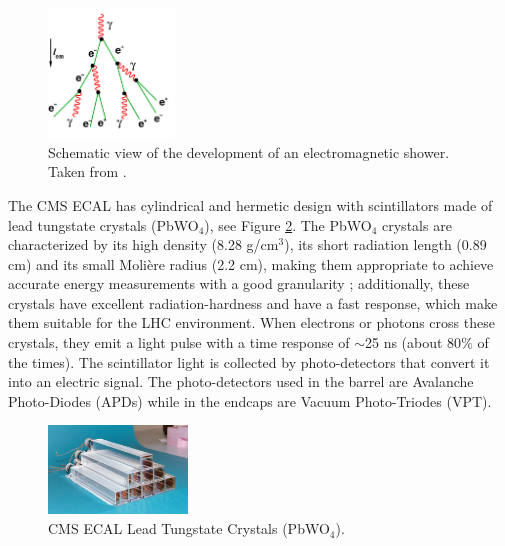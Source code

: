 
\begin{figure}[ht]
    \begin{center}
      \includegraphics[width=0.3\textwidth]{figuras/Chapter2/ElectroCascade.png}
      \caption{Schematic view of the development of an electromagnetic shower. Taken from \cite{EMFigure}.
      } \label{figchp2:EMshower}
    \end{center}
 \end{figure}

\noindent The CMS ECAL has cylindrical and hermetic design with scintillators made of 
lead tungstate crystals (PbWO$_{4}$), see Figure \ref{figchp2:ECALcrytal}. The PbWO$_{4}$ crystals are
characterized by its high density (8.28 g/cm$^{3}$), its short radiation length (0.89 cm) and its
small Moli\`ere radius (2.2 cm), making them appropriate to achieve 
accurate energy measurements with a good granularity \cite{chp2:CMS}; additionally,
these crystals have excellent radiation-hardness and have a fast response, which make them
suitable for the LHC environment. When electrons or photons cross these crystals, they emit a light pulse 
with a time response of $\sim$25 ns (about 80$\%$ of the times). The scintillator
light is collected by photo-detectors that convert it into an electric signal. The photo-detectors 
used in the barrel are Avalanche Photo-Diodes (APDs) while in the endcaps are Vacuum Photo-Triodes (VPT). \\

\begin{figure}[ht]
    \begin{center}
      \includegraphics[width=0.33\textwidth]{figuras/Chapter2/ECALcrytal.jpg}
      \caption{CMS ECAL Lead Tungstate Crystals (PbWO$_{4}$).
      } \label{figchp2:ECALcrytal}
    \end{center}
 \end{figure}
 
